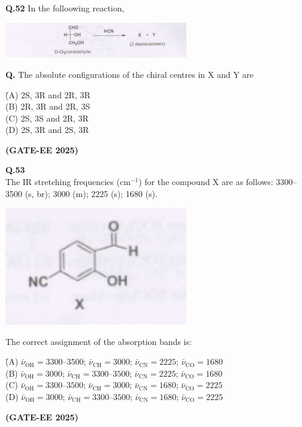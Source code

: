 \documentclass[12pt]{article}
\begin{document}
\begin{enumerate}
\textbf{Q.52} In the folloowing reaction,

\begin{center}
\includegraphics[width=0.6\textwidth]{q52.png}
\end{center}

\textbf{Q.} The absolute configurations of the chiral centres in X and Y are

\begin{tabbing}
\hspace{1cm} \= (A) \quad 2S, 3R \quad and \quad 2R, 3R \\
\> (B) \quad 2R, 3R \quad and \quad 2R, 3S \\
\> (C) \quad 2S, 3S \quad and \quad 2R, 3R \\
\> (D) \quad 2S, 3R \quad and \quad 2S, 3R
\end{tabbing}   \textbf{(GATE-EE 2025)}


\textbf{Q.53} \\
The IR stretching frequencies (cm$^{-1}$) for the compound X are as follows: 3300--3500 (s, br); 3000 (m); 2225 (s); 1680 (s). \\

\begin{center}
\includegraphics[width=0.6\textwidth]{q53.png}
\end{center}

The correct assignment of the absorption bands is:

\begin{tabbing}
\hspace{1cm} \= (A) \quad $\bar{\nu}_{\text{OH}} = 3300$--$3500$; $\bar{\nu}_{\text{CH}} = 3000$; $\bar{\nu}_{\text{CN}} = 2225$; $\bar{\nu}_{\text{CO}} = 1680$ \\
\> (B) \quad $\bar{\nu}_{\text{OH}} = 3000$; $\bar{\nu}_{\text{CH}} = 3300$--$3500$; $\bar{\nu}_{\text{CN}} = 2225$; $\bar{\nu}_{\text{CO}} = 1680$ \\
\> (C) \quad $\bar{\nu}_{\text{OH}} = 3300$--$3500$; $\bar{\nu}_{\text{CH}} = 3000$; $\bar{\nu}_{\text{CN}} = 1680$; $\bar{\nu}_{\text{CO}} = 2225$ \\
\> (D) \quad $\bar{\nu}_{\text{OH}} = 3000$; $\bar{\nu}_{\text{CH}} = 3300$--$3500$; $\bar{\nu}_{\text{CN}} = 1680$; $\bar{\nu}_{\text{CO}} = 2225$
\end{tabbing}   \textbf{(GATE-EE 2025)}



\end{enumerate}
\end{document}
